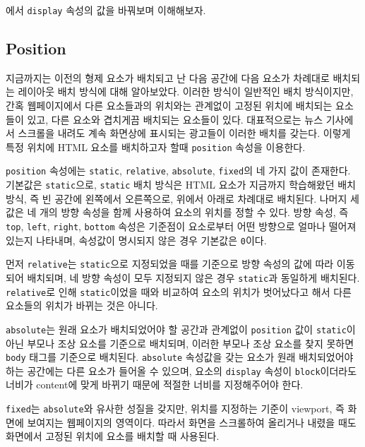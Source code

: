 에서 \texttt{display} 속성의 값을 바꿔보며 이해해보자. 

\subsection*{Position}

지금까지는 이전의 형제 요소가 배치되고 난 다음 공간에 다음 요소가 차례대로 배치되는 레이아웃 배치 방식에 대해 알아보았다. 이러한 방식이 일반적인 배치 방식이지만, 간혹 웹페이지에서 다른 요소들과의 위치와는 관계없이 고정된 위치에 배치되는 요소들이 있고, 다른 요소와 겹치게끔 배치되는 요소들이 있다. 대표적으로는 뉴스 기사에서 스크롤을 내려도 계속 화면상에 표시되는 광고들이 이러한 배치를 갖는다. 이렇게 특정 위치에 HTML 요소를 배치하고자 할때 \texttt{position} 속성을 이용한다.

\texttt{position} 속성에는 \texttt{static}, \texttt{relative}, \texttt{absolute}, \texttt{fixed}의 네 가지 값이 존재한다. 기본값은 \texttt{static}으로, \texttt{static} 배치 방식은 HTML 요소가 지금까지 학습해왔던 배치 방식, 즉 빈 공간에 왼쪽에서 오른쪽으로, 위에서 아래로 차례대로 배치된다. 나머지 세 값은 네 개의 방향 속성을 함께 사용하여 요소의 위치를 정할 수 있다. 방향 속성, 즉 \texttt{top}, \texttt{left}, \texttt{right}, \texttt{bottom} 속성은 기준점이 요소로부터 어떤 방향으로 얼마나 떨어져 있는지 나타내며, 속성값이 명시되지 않은 경우 기본값은 \texttt{0}이다.

먼저 \texttt{relative}는 \texttt{static}으로 지정되었을 때를 기준으로 방향 속성의 값에 따라 이동되어 배치되며, 네 방향 속성이 모두 지정되지 않은 경우 \texttt{static}과 동일하게 배치된다. \texttt{relative}로 인해 \texttt{static}이었을 때와 비교하여 요소의 위치가 벗어났다고 해서 다른 요소들의 위치가 바뀌는 것은 아니다.

\texttt{absolute}는 원래 요소가 배치되었어야 할 공간과 관계없이 \texttt{position} 값이 \texttt{static}이 아닌 부모나 조상 요소를 기준으로 배치되며, 이러한 부모나 조상 요소를 찾지 못하면 \texttt{body} 태그를 기준으로 배치된다. \texttt{absolute} 속성값을 갖는 요소가 원래 배치되었어야 하는 공간에는 다른 요소가 들어올 수 있으며, 요소의 \texttt{display} 속성이 \texttt{block}이더라도 너비가 content에 맞게 바뀌기 때문에 적절한 너비를 지정해주어야 한다.

\texttt{fixed}는 \texttt{absolute}와 유사한 성질을 갖지만, 위치를 지정하는 기준이 viewport, 즉 화면에 보여지는 웹페이지의 영역이다. 따라서 화면을 스크롤하여 올리거나 내렸을 때도 화면에서 고정된 위치에 요소를 배치할 때 사용된다.


